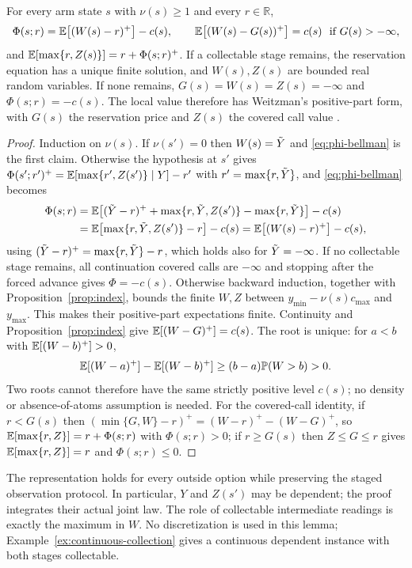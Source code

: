\begin{lemma}\label{lem:nested}
For every arm state $s$ with $\nu(s)\ge1$ and every $r\in\mathbb R$,
\[
\Phi(s;r)=\mathbb{E}\bigl[(W(s)-r)^+\bigr]-c(s),\qquad
\mathbb{E}\bigl[(W(s)-G(s))^+\bigr]=c(s)\ \text{ if }G(s)>-\infty,
\]
and $\mathbb{E}[\max\{r,Z(s)\}]=r+\Phi(s;r)^+$. If a collectable stage remains, the reservation
equation has a unique finite solution, and $W(s),Z(s)$ are bounded real random variables.
If none remains, $G(s)=W(s)=Z(s)=-\infty$ and $\Phi(s;r)=-c(s)$.
The local value therefore has Weitzman's positive-part form, with $G(s)$ the reservation
price and $Z(s)$ the covered call value \citep{kleinberg2016descending}.
\end{lemma}
\begin{proof}
Induction on $\nu(s)$. If $\nu(s')=0$ then $W(s)=\tilde Y$ and \eqref{eq:phi-bellman} is the first
claim. Otherwise the hypothesis at $s'$ gives $\Phi(s';r')^+=\mathbb{E}[\max\{r',Z(s')\}\mid Y]-r'$ with
$r'=\max\{r,\tilde Y\}$, and \eqref{eq:phi-bellman} becomes
\begin{align*}
\Phi(s;r)&=\mathbb{E}\bigl[(\tilde Y-r)^+ + \max\{r,\tilde Y,Z(s')\}-\max\{r,\tilde Y\}\bigr]-c(s)\\
&=\mathbb{E}\bigl[\max\{r,\tilde Y,Z(s')\}-r\bigr]-c(s)=\mathbb{E}\bigl[(W(s)-r)^+\bigr]-c(s),
\end{align*}
using $(\tilde Y-r)^+=\max\{r,\tilde Y\}-r$, which holds also for $\tilde Y=-\infty$.
If no collectable stage remains, all continuation covered calls are $-\infty$ and stopping
after the forced advance gives $\Phi=-c(s)$. Otherwise backward induction, together with
Proposition~\ref{prop:index}, bounds the finite $W,Z$ between
$y_{\min}-\nu(s)c_{\max}$ and $y_{\max}$. This makes their positive-part expectations finite.
Continuity and Proposition~\ref{prop:index} give
$\mathbb{E}[(W-G)^+]=c(s)$. The root is unique: for $a<b$ with $\mathbb{E}[(W-b)^+]>0$,
\[
\mathbb{E}[(W-a)^+]-\mathbb{E}[(W-b)^+]\ge(b-a)\mathbb{P}(W>b)>0.
\]
Two roots cannot therefore have the same strictly positive level $c(s)$; no density or
absence-of-atoms assumption is needed. For the covered-call identity, if $r<G(s)$ then
$(\min\{G,W\}-r)^+=(W-r)^+-(W-G)^+$, so $\mathbb{E}[\max\{r,Z\}]=r+\Phi(s;r)$ with $\Phi(s;r)>0$; if
$r\ge G(s)$ then $Z\le G\le r$ gives $\mathbb{E}[\max\{r,Z\}]=r$ and $\Phi(s;r)\le0$.
\end{proof}

The representation holds for every outside option while preserving the staged observation protocol.
In particular,
$Y$ and $Z(s')$ may be dependent; the proof integrates their actual joint law. The role of
collectable intermediate readings is exactly the maximum in $W$. No discretization is used
in this lemma; Example~\ref{ex:continuous-collection} gives a continuous dependent instance
with both stages collectable.

